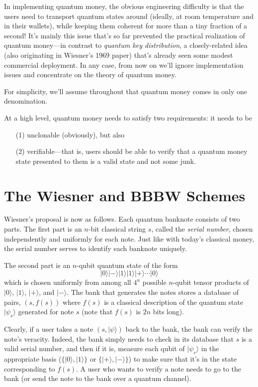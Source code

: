 \documentclass[11pt]{report}
\theoremstyle{plain}
\theoremstyle{definition}
\renewcommand{\ket}[1]{|#1\rangle}
\begin{document}
In implementing quantum money, the obvious engineering difficulty is that the users need to transport quantum states around (ideally, at room temperature and in their wallets), while keeping them coherent for more than a tiny fraction of a second!  It's mainly this issue that's so far prevented the practical realization of quantum money---in contrast to {\em quantum key distribution}, a closely-related idea (also originating in Wiesner's 1969 paper) that's already seen some modest commercial deployment.  In any case, from now on we'll ignore implementation issues and concentrate on the theory of quantum money.

For simplicity, we'll assume throughout that quantum money comes in only one denomination.

At a high level, quantum money needs to satisfy two requirements: it needs to be
\begin{enumerate}
\item[(1)] unclonable (obviously), but also
\item[(2)] verifiable---that is, users should be able to verify that a quantum money state presented to them is a valid state and not some junk.
\end{enumerate}

\section{The Wiesner and BBBW Schemes}

Wiesner's proposal is now as follows.  Each quantum banknote consists of two parts. The first part is an $n$-bit classical string $s$, called the {\em serial number}, chosen independently and uniformly for each note.  Just like with today's classical money, the serial number serves to identify each banknote uniquely.

The second part is an $n$-qubit quantum state of the form
\[ \ket{0} \ket{-} \ket{1} \ket{1} \ket{+} \cdots \ket{0} \]
which is chosen uniformly from among all $4^n$ possible $n$-qubit tensor products of $\ket{0}$, $\ket{1}$, $\ket{+}$, and $\ket{-}$. The bank that generates the notes stores
a database of pairs, $(s,f(s))$ where $f(s)$ is a classical description of the quantum state $\ket{\psi_s}$ generated for note $s$ (note that $f(s)$ is $2n$ bits long).

Clearly, if a user takes a note $(s,\ket{\psi})$ back to the bank, the bank can verify the note's veracity.  Indeed, the bank simply needs to check in its database that $s$ is a valid serial number, and then if it is, measure each qubit of $\ket{\psi_s}$ in the appropriate basis ($\{ \ket{0},\ket{1}\}$ or $\{ \ket{+},\ket{-}\}$) to make sure
that it's in the state corresponding to $f(s)$.  A user who wants to verify a note needs to go to the bank (or send the note to the bank over a quantum channel).
\end{document}
